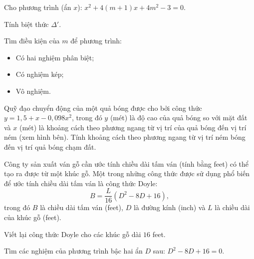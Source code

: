 \begin{practice}
\begin{questions}[resume=SBT]
        \answerline
        \answerline

        \item Cho phương trình (ẩn $x$): $x^2+4(m+1)x+4m^2-3=0$.
        \begin{questions}
            \item Tính biệt thức $\Delta'$.
            \item Tìm điều kiện của $m$ để phương trình:
            \begin{itemize}
                \item Có hai nghiệm phân biệt;
                \item Có nghiệm kép;
                \item Vô nghiệm.
            \end{itemize}
        \end{questions}
        \answerline
        \answerline
        \answerline

        \item Quỹ đạo chuyển động của một quả bóng được cho bởi công thức $y=1{,}5+x-0{,}098x^2$, trong đó $y$ (mét) là độ cao của quả bóng so với mặt đất và $x$ (mét) là khoảng cách theo phương ngang từ vị trí của quả bóng đến vị trí ném (xem hình bên). Tính khoảng cách theo phương ngang từ vị trí ném bóng đến vị trí quả bóng chạm đất.

        \begin{center}
        \end{center}

        \answerline
        \answerline

        \item Công ty sản xuất ván gỗ cần ước tính chiều dài tấm ván (tính bằng feet) có thể tạo ra được từ một khúc gỗ. Một trong những công thức được sử dụng phổ biến để ước tính chiều dài tấm ván là công thức Doyle:
        \[
            B=\dfrac{L}{16}(D^2-8D+16),
        \]
        trong đó $B$ là chiều dài tấm ván (feet), $D$ là đường kính (inch) và $L$ là chiều dài của khúc gỗ (feet).
        \begin{questions}
            \item Viết lại công thức Doyle cho các khúc gỗ dài $16$ feet.
            \item Tìm các nghiệm của phương trình bậc hai ẩn $D$ sau: $D^2-8D+16=0$.
        \end{questions}
        \answerline
        \answerline
    \end{questions}
\end{practice}
